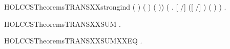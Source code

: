 \begin{SaveVerbatim}{HOLCCSTheoremsTRANSXXstrongind}
             (  ) (  ) (  )) \HOLSymConst{\HOLTokenConj{}}
       (\HOLSymConst{\HOLTokenForall{}}   .
            [  /]  \HOLTokenTransBegin{}\HOLTokenTransEnd {} \HOLSymConst{\HOLTokenConj{}}  ([  /] )   \HOLSymConst{\HOLTokenImp{}}
             (  )  ) \HOLSymConst{\HOLTokenImp{}}
       \HOLSymConst{\HOLTokenForall{}}  .  \HOLTokenTransBegin{}\HOLTokenTransEnd {} \HOLSymConst{\HOLTokenImp{}}    
\end{SaveVerbatim}
\newcommand{\HOLCCSTheoremsTRANSXXstrongind}{\UseVerbatim{HOLCCSTheoremsTRANSXXstrongind}}
\begin{SaveVerbatim}{HOLCCSTheoremsTRANSXXSUM}
\HOLTokenTurnstile{} \HOLSymConst{\HOLTokenForall{}}   .  \HOLSymConst{\ensuremath{+}}  \HOLTokenTransBegin{}\HOLTokenTransEnd {} \HOLSymConst{\HOLTokenImp{}}  \HOLTokenTransBegin{}\HOLTokenTransEnd {} \HOLSymConst{\HOLTokenDisj{}}  \HOLTokenTransBegin{}\HOLTokenTransEnd {}
\end{SaveVerbatim}
\newcommand{\HOLCCSTheoremsTRANSXXSUM}{\UseVerbatim{HOLCCSTheoremsTRANSXXSUM}}
\begin{SaveVerbatim}{HOLCCSTheoremsTRANSXXSUMXXEQ}
\HOLTokenTurnstile{} \HOLSymConst{\HOLTokenForall{}}   .  \HOLSymConst{\ensuremath{+}}  \HOLTokenTransBegin{}\HOLTokenTransEnd {} \HOLSymConst{\HOLTokenEquiv{}}  \HOLTokenTransBegin{}\HOLTokenTransEnd {} \HOLSymConst{\HOLTokenDisj{}}  \HOLTokenTransBegin{}\HOLTokenTransEnd {}
\end{SaveVerbatim}
